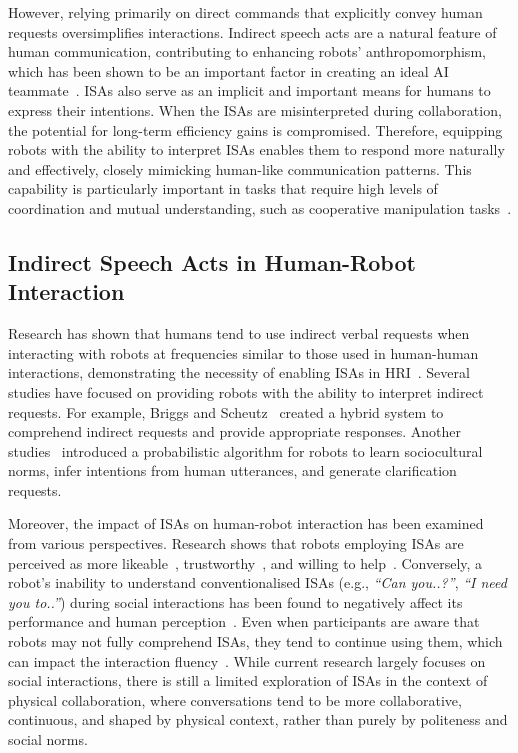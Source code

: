 However, relying primarily on direct commands that explicitly convey human requests oversimplifies interactions. Indirect speech acts are a natural feature of human communication, contributing to enhancing robots' anthropomorphism, which has been shown to be an important factor in creating an ideal AI teammate~\cite{zhang2021ideal}. ISAs also serve as an implicit and important means for humans to express their intentions. When the ISAs are misinterpreted during collaboration, the potential for long-term efficiency gains is compromised. Therefore, equipping robots with the ability to interpret ISAs enables them to respond more naturally and effectively, closely mimicking human-like communication patterns. This capability is particularly important in tasks that require high levels of coordination and mutual understanding, such as cooperative manipulation tasks~\cite{shah2011improved}.

\subsection{Indirect Speech Acts in Human-Robot Interaction}
Research has shown that humans tend to use indirect verbal requests when interacting with robots at frequencies similar to those used in human-human interactions, demonstrating the necessity of enabling ISAs in HRI~\cite{lee2010receptionist, bennett2017differences}. Several studies have focused on providing robots with the ability to interpret indirect requests. For example, Briggs and Scheutz~\cite{briggs2013hybrid} created a hybrid system to comprehend indirect requests and provide appropriate responses. Another studies~\cite{williams2015going, wen2020dempster} introduced a probabilistic algorithm for robots to learn sociocultural norms, infer intentions from human utterances, and generate clarification requests.

Moreover, the impact of ISAs on human-robot interaction has been examined from various perspectives. Research shows that robots employing ISAs are perceived as more likeable~\cite{torrey2013robot, strait2014let}, trustworthy~\cite{saunderson2021robots}, and willing to help~\cite{srinivasan2016help}. Conversely, a robot's inability to understand conventionalised ISAs (e.g., \textit{``Can you..?''}, \textit{``I need you to..''}) during social interactions has been found to negatively affect its performance and human perception~\cite{williams2018thank}. Even when participants are aware that robots may not fully comprehend ISAs, they tend to continue using them, which can impact the interaction fluency~\cite{briggs2017enabling}. While current research largely focuses on social interactions, there is still a limited exploration of ISAs in the context of physical collaboration, where conversations tend to be more collaborative, continuous, and shaped by physical context, rather than purely by politeness and social norms.

